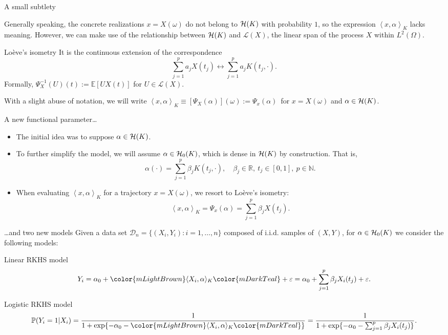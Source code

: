 \documentclass[9pt, english, professionalfonts]{beamer}
\newcommand\maroon[1]{\color{mLightBrown}#1\color{mDarkTeal}}
\newcommand{\N} {\ensuremath{\mathds{N}}}
\newcommand{\R} {\ensuremath{\mathds{R}}}
\newcommand{\E} {\ensuremath{\mathds{E}}}
\newcommand{\Hcal} {\ensuremath\mathcal{H}}
\newcommand\dotprod[2]{\left\langle #1, #2 \right\rangle}
\begin{document}
\begin{frame}{A small subtlety}

  Generally speaking, the concrete realizations \(x=X(\omega)\) \maroon{do not belong to \(\Hcal(K)\) with probability \(1\)}, so the expression \(\dotprod{x}{\alpha}_K\) lacks meaning. However, we can make use of the relationship between \(\Hcal(K)\) and \(\mathcal L(X)\), the linear span of the process \(X\) within \(L^2(\Omega)\).

  \vspace{1em}
  \begin{block}{Loève's isometry}
    It is the continuous extension of the correspondence
    \[
\sum_{j=1}^p a_j X(t_j) \longleftrightarrow \sum_{j=1}^p a_j K(t_j, \cdot).
    \]
    Formally, \(\Psi^{-1}_X(U)(t) := \E[U X(t)]\) for \(U \in \mathcal L(X)\).
  \end{block}
  With a slight abuse of notation, we will write \maroon{\(\dotprod{x}{\alpha}_K \equiv [\Psi_X(\alpha)](\omega) := \Psi_x(\alpha)\)}\ for \(x=X(\omega)\) and \(\alpha \in \Hcal(K)\).
\end{frame}

\begin{frame}{A new functional parameter\ldots}
  \begin{itemize}
    \item The initial idea was to suppose \(\alpha \in \Hcal(K)\).
    \item To further simplify the model, we will assume \(\alpha \in \Hcal_0(K)\), which is dense in \(\Hcal(K)\) by construction. That is,
    \[
      \alpha(\cdot) = \sum_{j=1}^p \beta_j K(t_j, \cdot), \quad \beta_j \in \R, \ t_j \in [0, 1], \ p \in \N.
    \]
    \item When evaluating \(\dotprod{x}{\alpha}_K\) for a trajectory \(x=X(\omega)\), we resort to Loève's isometry:
    \[
      \dotprod{x}{\alpha}_K = \Psi_x(\alpha) = \sum_{j=1}^p \beta_j X(t_j).
    \]
  \end{itemize}

\end{frame}


\begin{frame}{\ldots and two new models}
  Given a data set \(\mathcal D_n = \{(X_i, Y_i): i=1,\dots, n\}\) composed of i.i.d. samples of \((X, Y)\), for \(\alpha \in \Hcal_0(K)\) we consider the following models:

  \vspace{1em}

  \begin{block}{Linear RKHS model}
  \[
    Y_i = \alpha_0 + \maroon{\langle X_i, \alpha \rangle_K} + \varepsilon = \alpha_0 + \sum_{j=1}^p \beta_j X_i(t_j) + \varepsilon.
  \]
\end{block}
\vspace{1em}

\begin{block}{Logistic RKHS model}
    \[
    \mathbb P (Y_i=1| X_i) = \frac{1}{1 + \exp\{-\alpha_0 - \maroon{\langle X_i, \alpha\rangle_K}\}} = \frac{1}{1 + \exp\{-\alpha_0 - \sum_{j=1}^p \beta_j X_i(t_j)\}}.
  \]
\end{block}

\end{frame}
\end{document}
